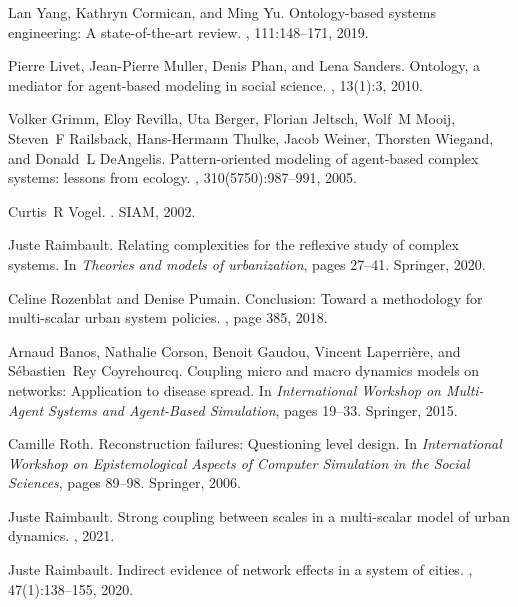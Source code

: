 \begin{thebibliography}{10}
Lan Yang, Kathryn Cormican, and Ming Yu.
\newblock Ontology-based systems engineering: A state-of-the-art review.
, 111:148--171, 2019.

Pierre Livet, Jean-Pierre Muller, Denis Phan, and Lena Sanders.
\newblock Ontology, a mediator for agent-based modeling in social science.
, 13(1):3,
  2010.

Volker Grimm, Eloy Revilla, Uta Berger, Florian Jeltsch, Wolf~M Mooij, Steven~F
  Railsback, Hans-Hermann Thulke, Jacob Weiner, Thorsten Wiegand, and Donald~L
  DeAngelis.
\newblock Pattern-oriented modeling of agent-based complex systems: lessons
  from ecology.
, 310(5750):987--991, 2005.

Curtis~R Vogel.
.
\newblock SIAM, 2002.

Juste Raimbault.
\newblock Relating complexities for the reflexive study of complex systems.
\newblock In {\em Theories and models of urbanization}, pages 27--41. Springer,
  2020.

Celine Rozenblat and Denise Pumain.
\newblock Conclusion: Toward a methodology for multi-scalar urban system
  policies.
,
  page 385, 2018.

Arnaud Banos, Nathalie Corson, Benoit Gaudou, Vincent Laperri{\`e}re, and
  S{\'e}bastien~Rey Coyrehourcq.
\newblock Coupling micro and macro dynamics models on networks: Application to
  disease spread.
\newblock In {\em International Workshop on Multi-Agent Systems and Agent-Based
  Simulation}, pages 19--33. Springer, 2015.

Camille Roth.
\newblock Reconstruction failures: Questioning level design.
\newblock In {\em International Workshop on Epistemological Aspects of Computer
  Simulation in the Social Sciences}, pages 89--98. Springer, 2006.

Juste Raimbault.
\newblock Strong coupling between scales in a multi-scalar model of urban
  dynamics.
, 2021.

Juste Raimbault.
\newblock Indirect evidence of network effects in a system of cities.
,
  47(1):138--155, 2020.


\end{thebibliography}
